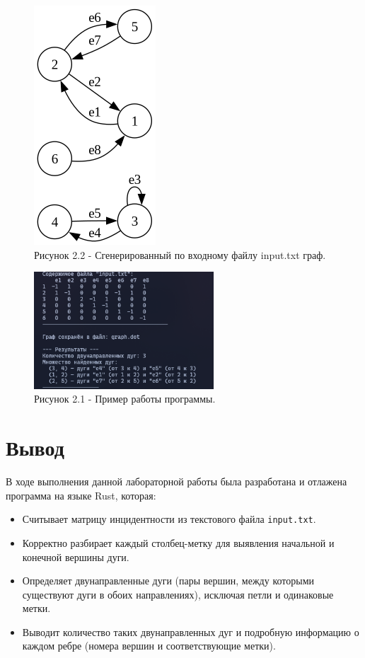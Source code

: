 \documentclass[oneside,a4paper,14pt]{extarticle}
\begin{document}
\clearpage
\begin{figure}[H]
	\centering
	\includegraphics[height=0.5\textheight]{pics/graph.png}
	\caption*{Рисунок 2.2 - Сгенерированный по входному файлу input.txt граф.}
\end{figure}

\begin{figure}[H]
	\centering
	\includegraphics[width=0.6\textwidth]{pics/screen.png}
	\caption*{Рисунок 2.1 - Пример работы программы.}
\end{figure}

\section*{Вывод}


В ходе выполнения данной лабораторной работы была разработана и отлажена программа на языке Rust, которая:
\begin{itemize}
    \item Считывает матрицу инцидентности из текстового файла \texttt{input.txt}.
    \item Корректно разбирает каждый столбец-метку для выявления начальной и конечной вершины дуги.
    \item Определяет двунаправленные дуги (пары вершин, между которыми существуют дуги в обоих направлениях), исключая петли и одинаковые метки.
    \item Выводит количество таких двунаправленных дуг и подробную информацию о каждом ребре (номера вершин и соответствующие метки).
\end{itemize}
\end{document}

